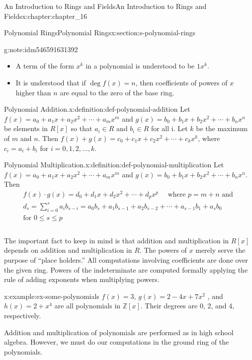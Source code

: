 \documentclass[oneside,10pt,]{book}
\numberwithin{equation}{section}
\begin{document}
\begin{chapterptx}{An Introduction to Rings and Fields}{}{An Introduction to Rings and Fields}{}{}{x:chapter:chapter_16}
\begin{sectionptx}{Polynomial Rings}{}{Polynomial Rings}{}{}{x:section:s-polynomial-rings}
\begin{note}{}{g:note:idm546591631392}
\begin{itemize}[label=\textbullet]
\item{}A term of the form \(x^k\) in a polynomial is understood to be \(1 x^k\).%
\item{}It is understood that if \(\deg f(x) = n\), then coefficients of powers of \(x\) higher than \(n\) are equal to the zero of the base ring.%
\end{itemize}
%
\end{note}
\begin{definition}{Polynomial Addition.}{x:definition:def-polynomial-addition}%
%
Let \(f(x) =a_0 + a_1 x+a_2 x^2+ \cdots +a_m x^m\) and \(g(x) =b_0 + b_1 x+b_2 x^2+ \cdots +b_n x^n\) be elements in \(R[x]\) so that \(a_i \in  R\) and \(b_i\in R\)  for all i. Let \(k\) be the maximum of \(m\) and \(n\).  Then  \(f(x) + g(x) =c_0 + c_1 x+c_2 x^2+ \cdots +c_k x^k\), where \(c_i=a_i+b_i\) for \(i = 0, 1, 2, \ldots , k\).%
\end{definition}
\begin{definition}{Polynomial Multiplication.}{x:definition:def-polynomial-multiplication}%
%
Let \(f(x) =a_0 + a_1 x+a_2 x^2+ \cdots +a_m x^m\) and \(g(x) =b_0 + b_1 x+b_2 x^2+ \cdots +b_n x^n\).  Then%
\begin{equation*}
\begin{array}{c}
f(x) \cdot  g(x) = d_0 + d_1 x+d_2 x^2+ \cdots +d_p x^p \quad \textrm{ where } p=m+n \textrm{ and }\\
d_s=\sum_{i=0}^s a_i b_{s-i} =a_0 b_s+a_1 b_{s-1}+a_2 b_{s-2}+\cdots +a_{s-1} b_1+a_s b_0\\
\textrm{for } 0\leq s\leq p\\
\\
\end{array}
\end{equation*}
%
\end{definition}
The important fact to keep in mind is that addition and multiplication in \(R[x]\) depends on addition and multiplication in \(R\). The powers of \(x\) merely serve the purpose of ``place holders.'' All computations involving coefficients are done over the given ring.  Powers of the indeterminate are computed formally applying the rule of adding exponents when multiplying powers.%
\begin{example}{}{x:example:ex-some-polynomials}%
\(f(x) = 3\), \(g(x) = 2 - 4x +7x^2\) , and \(h(x) = 2 + x^4\) are all polynomials in \(\mathbb{Z}[x]\). Their degrees are 0, 2, and 4, respectively.%
\end{example}
Addition and multiplication of polynomials are performed as in high school algebra. However, we must do our computations in the ground ring of the polynomials.%

\end{sectionptx}
\end{chapterptx}
\end{document}
